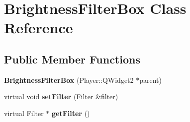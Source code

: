 \hypertarget{classBrightnessFilterBox}{}\section{Brightness\+Filter\+Box Class Reference}
\label{classBrightnessFilterBox}
\subsection*{Public Member Functions}
\begin{DoxyCompactItemize}
\item 
\hypertarget{classBrightnessFilterBox_a7906f4c52917d68ebd32a3230431d2f6}{}{\bfseries Brightness\+Filter\+Box} (Player\+::\+Q\+Widget2 $\ast$parent)\label{classBrightnessFilterBox_a7906f4c52917d68ebd32a3230431d2f6}

\item 
\hypertarget{classBrightnessFilterBox_a09e99b0db09b8468ce7d7e0f98293ac5}{}virtual void {\bfseries set\+Filter} (Filter \&filter)\label{classBrightnessFilterBox_a09e99b0db09b8468ce7d7e0f98293ac5}

\item 
\hypertarget{classBrightnessFilterBox_ad7b14770615490d1445c958c79fd3adb}{}virtual Filter $\ast$ {\bfseries get\+Filter} ()\label{classBrightnessFilterBox_ad7b14770615490d1445c958c79fd3adb}

\end{DoxyCompactItemize}
